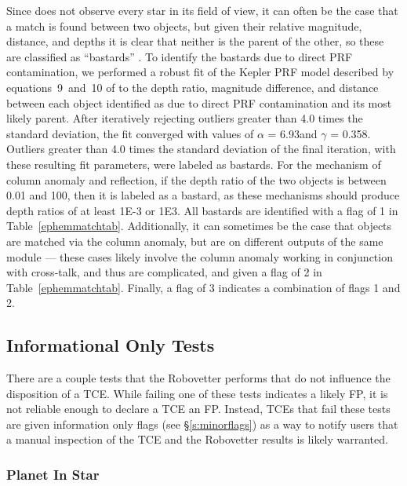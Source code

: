 Since \kepler{} does not observe every star in its field of view, it can often be the case that a match is found between two objects, but given their relative magnitude, distance, and depths it is clear that neither is the parent of the other, so these are classified as ``bastards'' \citep{Coughlin2014a}. To identify the bastards due to direct PRF contamination, we performed a robust fit of the Kepler PRF model described by equations~9~and~10 of \citet{Coughlin2014a} to the depth ratio, magnitude difference, and distance between each object identified as due to direct PRF contamination and its most likely parent. After iteratively rejecting outliers greater than 4.0 times the standard deviation, the fit converged with values of $\alpha$ = 6.93\arcsec and $\gamma$ = 0.358\arcsec. Outliers greater than 4.0 times the standard deviation of the final iteration, with these resulting fit parameters, were labeled as bastards. For the mechanism of column anomaly and reflection, if the depth ratio of the two objects is between 0.01 and 100, then it is labeled as a bastard, as these mechanisms should produce depth ratios of at least 1E-3 or 1E3. All bastards are identified with a flag of 1 in Table~\ref{ephemmatchtab}. Additionally, it can sometimes be the case that objects are matched via the column anomaly, but are on different outputs of the same module --- these cases likely involve the column anomaly working in conjunction with cross-talk, and thus are complicated, and given a flag of 2 in Table~\ref{ephemmatchtab}. Finally, a flag of 3 indicates a combination of flags 1 and 2. 



\subsection{Informational Only Tests}
\label{s:infoonly}

There are a couple tests that the Robovetter performs that do not influence the disposition of a TCE. While failing one of these tests indicates a likely FP, it is not reliable enough to declare a TCE an FP. Instead, TCEs that fail these tests are given information only flags (see \S\ref{s:minorflags}) as a way to notify users that a manual inspection of the TCE and the Robovetter results is likely warranted.


\subsubsection{Planet In Star}
\label{s:planetinstar}

